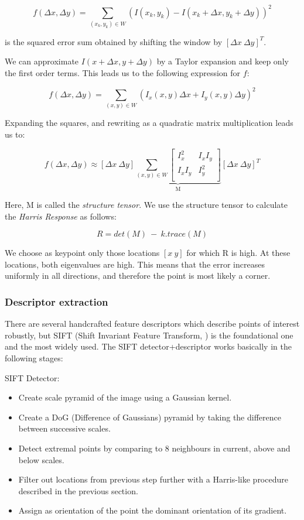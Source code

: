 \[f(\Delta x, \Delta y) = \sum_{(x_k, y_k) \in W}^{}(I(x_k, y_k) - I(x_k + \Delta x, y_k + \Delta y))^2\]

is the squared error sum obtained by shifting the window by $[\Delta x \ \Delta y]^T$.

We can approximate $I(x + \Delta x, y + \Delta y)$ by a Taylor expansion and keep only the first order terms. This leads us to the following expression for $f$:

\[f(\Delta x, \Delta y) = \sum_{(x, y) \in W}(I_x(x, y)\Delta x + I_y(x, y) \Delta y)^2\]

Expanding the squares, and rewriting as a quadratic matrix multiplication leads us to:

\[f(\Delta x, \Delta y) \approx [\Delta x \ \Delta y]\underbrace{\sum_{(x, y) \in W}\begin{bmatrix}
I_x^2 & I_xI_y\\
I_xI_y & I_y^2\\
\end{bmatrix}}_{\text{M}}[\Delta x \ \Delta y]^T\]

Here, M is called the \emph{structure tensor}. We use the structure tensor to calculate the \emph{Harris Response} as follows:

\[R = det(M)\ -\ k.trace(M)\]

We choose as keypoint only those locations $[x\ y]$ for which R is high. At these locations, both eigenvalues are high. This means  that the error increases uniformly in all directions, and therefore the point is most likely a corner. 

\subsubsection{Descriptor extraction}
There are several handcrafted feature descriptors which describe points of interest robustly, but SIFT (Shift Invariant Feature Transform, \cite{Lowe2004}) is the foundational one and the most widely used. The SIFT detector+descriptor works basically in the following stages:

SIFT Detector:
\begin{itemize}
\item Create scale pyramid of the image using a Gaussian kernel.
\item Create a DoG (Difference of Gaussians) pyramid by taking the difference between successive scales.
\item Detect extremal points by comparing to 8 neighbours in current, above and below scales.  
\item Filter out locations from previous step further with a Harris-like procedure described in the previous section.
\item Assign as orientation of the point the dominant orientation of its gradient.
\end{itemize}

